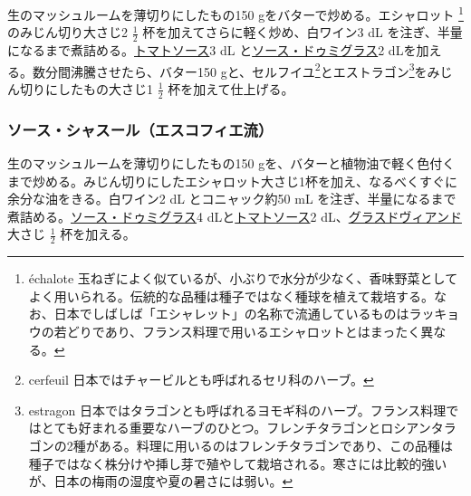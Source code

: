 \begin{recette}


生のマッシュルームを薄切りにしたもの150 gをバターで炒める。エシャロット
\footnote{échalote
  玉ねぎによく似ているが、小ぶりで水分が少なく、香味野菜としてよく用いられる。伝統的な品種は種子ではなく種球を植えて栽培する。なお、日本でしばしば「エシャレット」の名称で流通しているものはラッキョウの若どりであり、フランス料理で用いるエシャロットとはまったく異なる。}のみじん切り大さじ2
\(\frac{1}{2}\) 杯を加えてさらに軽く炒め、白ワイン3 dL
を注ぎ、半量になるまで煮詰める。\protect\hyperlink{sauce-tomate}{トマトソース}3
dL と\protect\hyperlink{sauce-demi-glace}{ソース・ドゥミグラス}2
dLを加える。数分間沸騰させたら、バター150 gと、セルフイユ\footnote{cerfeuil
  日本ではチャービルとも呼ばれるセリ科のハーブ。}とエストラゴン\footnote{estragon
  日本ではタラゴンとも呼ばれるヨモギ科のハーブ。フランス料理ではとても好まれる重要なハーブのひとつ。フレンチタラゴンとロシアンタラゴンの2種がある。料理に用いるのはフレンチタラゴンであり、この品種は種子ではなく株分けや挿し芽で殖やして栽培される。寒さには比較的強いが、日本の梅雨の湿度や夏の暑さには弱い。}をみじん切りにしたもの大さじ1
\(\frac{1}{2}\) 杯を加えて仕上げる。

\hypertarget{sauce-chasseur-procede-escoffier}{%
\subsubsection{ソース・シャスール（エスコフィエ流）}\label{sauce-chasseur-procede-escoffier}}



生のマッシュルームを薄切りにしたもの150
gを、バターと植物油で軽く色付くまで炒める。みじん切りにしたエシャロット大さじ1杯を加え、なるべくすぐに余分な油をきる。白ワイン2
dL とコニャック約50 mL
を注ぎ、半量になるまで煮詰める。\protect\hyperlink{sauce-demi-glace}{ソース・ドゥミグラス}4
dLと\protect\hyperlink{sauce-tomate}{トマトソース}2
dL、\protect\hyperlink{glace-de-viande}{グラスドヴィアンド}大さじ
\(\frac{1}{2}\) 杯を加える。


\end{recette}
